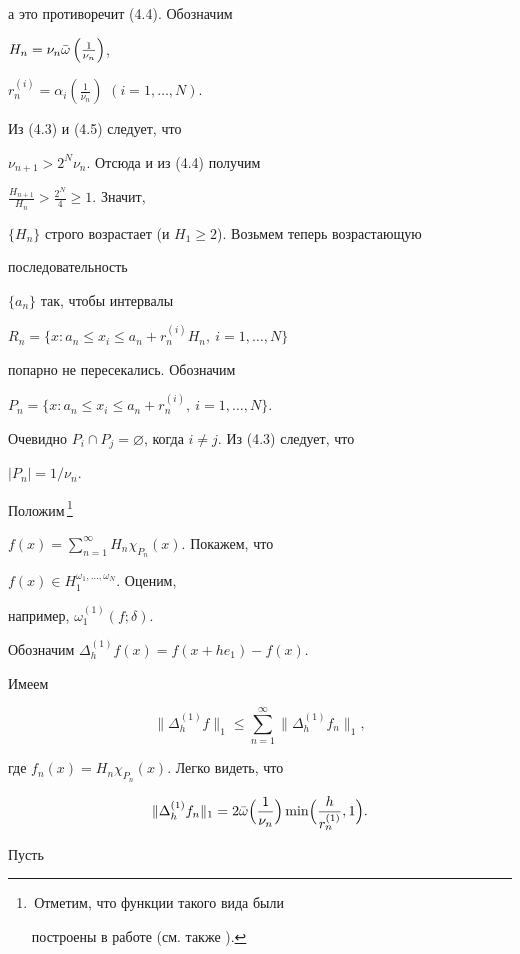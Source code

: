 \begin{pf}
а это противоречит (4.4). Обозначим 


$H_n=\nu_n\Bar\omega\left(\frac{1}{\nu_n}\right)$, 


$r_n^{(i)}=\alpha_i\left(\frac{1}{\nu_n}\right)$ $(i=1,\dotsc,N)$. 


Из (4.3) и (4.5) следует, что 


$\nu_{n+1}>2^N\nu_n$. Отсюда и из (4.4) получим 


$\frac{H_{n+1}}{H_n}>\frac{2^N}{4}\ge 1$. Значит, 


$\{H_n\}$ строго возрастает (и $H_1\ge 2$). Возьмем теперь возрастающую 


последовательность 


$\{a_n\}$ так, чтобы интервалы 


$R_n=\{x:a_n\le x_i\le a_n+r_n^{(i)}H_n, \ i=1,\dotsc,N\}$ 


попарно не пересекались. Обозначим 


$P_n=\{x:a_n\le x_i\le a_n+r_n^{(i)}, \ i=1,\dotsc,N\}$. 


Очевидно $P_i\cap P_j=\varnothing$, когда $i\ne j$. Из (4.3) следует, что 


$|P_n|=1/\nu_n$. 


 


Положим\,\footnote{\,\scriptsize Отметим, что функции такого вида были


построены в работе  \cite{Kol3} (см. также \cite{Kol2}).} 


$f(x)=\sum\limits^\infty_{n=1}H_n\chi_{P_n}(x)$. Покажем, что 


$f(x)\in H_1^{\omega_1,\dotsc,\omega_N}$. Оценим, 


например, $\omega_1^{(1)}(f;\delta)$. 


Обозначим $\Delta_h^{(1)}f(x)=f(x+he_1)-f(x)$. 


Имеем 


$$ 


\|\Delta_h^{(1)}f\|_1\le 


\sum\limits^\infty_{n=1}\|\Delta_h^{(1)}f_n\|_1,


$$ 


где $f_n(x)=H_n\chi_{P_n}(x)$. Легко видеть, что 


$$ 


\|\Delta_h^{(1)}f_n\|_1=2\Bar\omega\Bigl(\frac{1}{\nu_n}\Bigr) 


\min\Bigl(\frac{h}{r_n^{(1)}},1\Bigr). 


$$ 


Пусть 



\end{pf}
